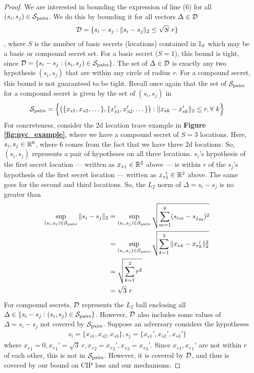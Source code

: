 \begin{proof}
We are interested in bounding the expression of line (6) for all $(s_i, s_j) \in \mathcal{S}_{\text{pairs}}$. We do this by bounding it for all vectors $\Delta \in \mathcal{D}$ 
\begin{align*}
	\mathcal{D} = \{ s_i - s_j : \| s_i - s_j \|_2 \leq  \sqrt{S}\  r \}
\end{align*}  
, where $S$ is the number of basic secrets (locations) contained in ${\mathbb{I}_S}$ which may be a basic or compound secret set. For a basic secret ($S = 1$), this bound is tight, since $\mathcal{D} = \{s_i - s_j: (s_i, s_j) \in \mathcal{S}_{\text{pairs}}\}$. The set of $\Delta \in \mathcal{D}$ is exactly any two hypothesis $(s_i, s_j)$ that are within any circle of radius $r$. For a compound secret, this bound is not guaranteed to be tight. Recall once again that the set of $\mathcal{S}_{\text{pairs}}$ for a compound secret is given by the set of $(s_i, s_j)$ in 
\begin{align*}
	\mathcal{S}_{\text{pairs}} = \Big\{\big( \{x_{s1}, x_{s2}, \dots\}, \{x_{s1}', x_{s2}', \dots\}\big): \| x_{sk} - x_{sk}' \|_2 \leq r, \forall \ k\Big\} 
\end{align*} 
For concreteness, consider the 2d location trace example in \textbf{Figure \ref{fig:nyc_example}}, where we have a compound secret of $S = 3$ locations. Here, $s_i, s_j \in {\mathbb R}^{6}$, where 6 comes from the fact that we have three 2d locations. So, $(s_i, s_j)$ represents a pair of hypotheses on all three locations. $s_i$'s hypothesis of the first secret location --- written as ${x_s}_1 \in {\mathbb R}^2$ above --- is within $r$ of the $s_j$'s hypothesis of the first secret location --- written as ${x_s}_1' \in {\mathbb R}^2$ above. The same goes for the second and third locations. So, the $L_2$ norm of $\Delta = s_i - s_j$ is no greater than
\begin{align*}
	\sup_{(s_i, s_j) \in \mathcal{S}_{\text{pairs}}} \|s_i - s_j\|_2 
	&=  \sup_{(s_i, s_j) \in \mathcal{S}_{\text{pairs}}} \sqrt{\sum_{m=1}^6 ({s_i}_m - {s_j}_m)^2} \\
	&=  \sup_{(s_i, s_j) \in \mathcal{S}_{\text{pairs}}} \sqrt{\sum_{k=1}^3 \|{x_s}_k - {x_s}_k'\|_2^2} \\
	&= \sqrt{\sum_{k=1}^3 r^2} \\
	&= \sqrt{3} \ r
\end{align*}
For compound secrets, $\mathcal{D}$ represents the $L_2$ ball enclosing all $\Delta \in \{s_i - s_j : (s_i, s_j) \in \mathcal{S}_{\text{pairs}} \}$. However, $\mathcal{D}$ also includes some values of $\Delta = s_i - s_j$ not covered by $\mathcal{S}_{\text{pairs}}$. Suppose an adversary considers the hypotheses 
\begin{align*}
s_i = \{x_{s1}, x_{s2}, x_{s3}\}, s_j = \{x_{s1}', x_{s2}', x_{s3}'\}
\end{align*} 
where ${x_s}_1 = 0, {x_s}_1' = \sqrt{3} \ r, {x_s}_2 = {x_s}_2', {x_s}_3 = {x_s}_3'$. Since ${x_s}_1, {x_s}_1'$ are not within $r$ of each other, this is not in $\mathcal{S}_{\text{pairs}}$. However, it is covered by $\mathcal{D}$, and thus is covered by our bound on CIP loss and our mechanisms. 


\end{proof}
